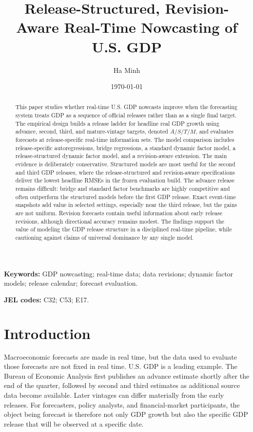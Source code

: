 \documentclass[12pt]{article}
\title{Release-Structured, Revision-Aware Real-Time Nowcasting of U.S. GDP}
\author{Ha Minh}
\date{\today}
\begin{document}
\maketitle

\begin{abstract}
This paper studies whether real-time U.S. GDP nowcasts improve when the forecasting system treats GDP as a sequence of official releases rather than as a single final target. The empirical design builds a release ladder for headline real GDP growth using advance, second, third, and mature-vintage targets, denoted $A/S/T/M$, and evaluates forecasts at release-specific real-time information sets. The model comparison includes release-specific autoregressions, bridge regressions, a standard dynamic factor model, a release-structured dynamic factor model, and a revision-aware extension. The main evidence is deliberately conservative. Structured models are most useful for the second and third GDP releases, where the release-structured and revision-aware specifications deliver the lowest headline RMSEs in the frozen evaluation build. The advance release remains difficult: bridge and standard factor benchmarks are highly competitive and often outperform the structured models before the first GDP release. Exact event-time snapshots add value in selected settings, especially near the third release, but the gains are not uniform. Revision forecasts contain useful information about early release revisions, although directional accuracy remains modest. The findings support the value of modeling the GDP release structure in a disciplined real-time pipeline, while cautioning against claims of universal dominance by any single model.
\end{abstract}

\noindent \textbf{Keywords:} GDP nowcasting; real-time data; data revisions; dynamic factor models; release calendar; forecast evaluation.

\noindent \textbf{JEL codes:} C32; C53; E17.

\section{Introduction}

Macroeconomic forecasts are made in real time, but the data used to evaluate those forecasts are not fixed in real time. U.S. GDP is a leading example. The Bureau of Economic Analysis first publishes an advance estimate shortly after the end of the quarter, followed by second and third estimates as additional source data become available. Later vintages can differ materially from the early releases. For forecasters, policy analysts, and financial-market participants, the object being forecast is therefore not only GDP growth but also the specific GDP release that will be observed at a specific date.
\end{document}
